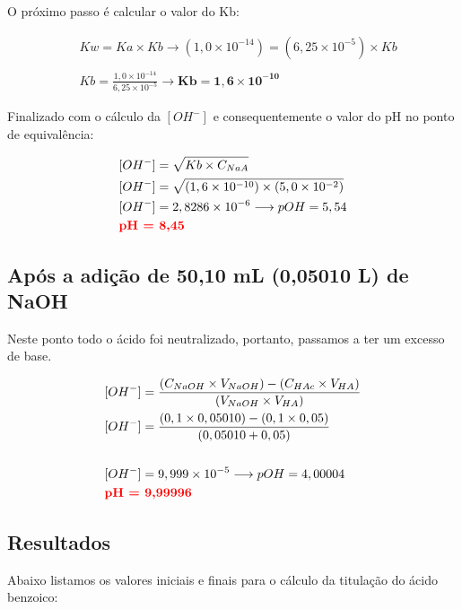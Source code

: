 \documentclass[a4paper, 12pt]{article}
\begin{document}
O próximo passo é calcular o valor do Kb: 

	\begin{align*}
		&Kw = Ka \times Kb \longrightarrow	 (1,0 \times 10^{-14}) = (6,25 \times 10^{-5}) \times Kb \\ \\
		&Kb = \frac{1,0 \times 10^{-14}}{6,25 \times 10^{-5}} \longrightarrow \mathbf{Kb = 1,6 \times 10^{-10}}
	\end{align*}

Finalizado com o cálculo da $[OH^{-}]$ e consequentemente o valor do pH no ponto de equivalência:

	\begin{align*}
		&[OH^{-}] = \sqrt{Kb \times C_{NaA}} \\
		&[OH^{-}] = \sqrt{(1,6 \times 10^{-10}) \times (5,0 \times 10^{-2})} \\
		&[OH^{-}] = 2,8286 \times 10^{-6} \longrightarrow	 pOH = 5,54 \\
		& \textbf{\textcolor{red}{pH = 8,45}}
	\end{align*}

\subsection{Após a adição de 50,10 mL (0,05010 L) de NaOH}
Neste ponto todo o ácido foi neutralizado, portanto, passamos a ter um excesso de base.

	\begin{align*}
		&[OH^{-}] = \frac{ (C_{NaOH} \times V_{NaOH}) - (C_{HAc} \times V_{HA}) }{ (V_{NaOH} \times V_{HA}) } \\
		&[OH^{-}] = \frac{ (0,1 \times 0,05010) - (0,1 \times 0,05) }{ (0,05010 + 0,05) } \\ \\	
		&[OH^{-}] = 9,999 \times 10^{-5} \longrightarrow	pOH = 4,00004 \\
		& \textbf{\textcolor{red}{pH = 9,99996}}
	\end{align*}

\subsection{Resultados}
Abaixo listamos os valores iniciais e finais para o cálculo da titulação do ácido benzoico:
\end{document}
